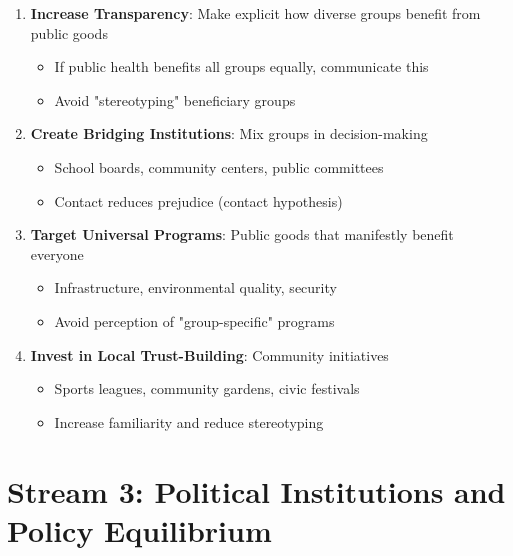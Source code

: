 \begin{enumerate}
\item \textbf{Increase Transparency}: Make explicit how diverse groups benefit from public goods
   \begin{itemize}
   \item If public health benefits all groups equally, communicate this
   \item Avoid "stereotyping" beneficiary groups
   \end{itemize}

\item \textbf{Create Bridging Institutions}: Mix groups in decision-making
   \begin{itemize}
   \item School boards, community centers, public committees
   \item Contact reduces prejudice (contact hypothesis)
   \end{itemize}

\item \textbf{Target Universal Programs}: Public goods that manifestly benefit everyone
   \begin{itemize}
   \item Infrastructure, environmental quality, security
   \item Avoid perception of "group-specific" programs
   \end{itemize}

\item \textbf{Invest in Local Trust-Building}: Community initiatives
   \begin{itemize}
   \item Sports leagues, community gardens, civic festivals
   \item Increase familiarity and reduce stereotyping
   \end{itemize}

\end{enumerate}

\clearpage


\section{Stream 3: Political Institutions and Policy Equilibrium}
\label{sec:alesina-institutions}

